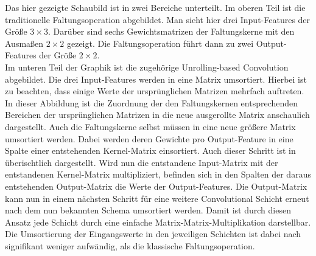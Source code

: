 \documentclass[../main.tex]{subfiles}
\begin{document}
Das hier gezeigte Schaubild ist in zwei Bereiche unterteilt. Im oberen Teil ist die traditionelle Faltungsoperation abgebildet. Man sieht hier drei Input-Features der Größe $3\times 3$. Darüber sind sechs Gewichtsmatrizen der Faltungskerne mit den Ausmaßen $2\times 2$ gezeigt. Die Faltungsoperation führt dann zu zwei Output-Features der Größe $2\times2$. \\ Im unteren Teil der Graphik ist die zugehörige Unrolling-based Convolution abgebildet. Die drei Input-Features werden in eine Matrix umsortiert. Hierbei ist zu beachten, dass einige Werte der ursprünglichen Matrizen mehrfach auftreten. In dieser Abbildung ist die Zuordnung der den Faltungskernen entsprechenden Bereichen der ursprünglichen Matrizen in die neue ausgerollte Matrix anschaulich dargestellt. Auch die Faltungskerne selbst müssen in eine neue größere Matrix umsortiert werden. Dabei werden deren Gewichte pro Output-Feature in eine Spalte einer entstehenden Kernel-Matrix einsortiert. Auch dieser Schritt ist in  überischtlich dargestellt. Wird nun die entstandene Input-Matrix mit der entstandenen Kernel-Matrix multipliziert, befinden sich in den Spalten der daraus entstehenden Output-Matrix die Werte der Output-Features. Die Output-Matrix kann nun in einem nächsten Schritt für eine weitere Convolutional Schicht erneut nach dem nun bekannten Schema umsortiert werden. Damit ist durch diesen Ansatz jede Schicht durch eine einfache Matrix-Matrix-Multiplikation darstellbar. Die Umsortierung der Eingangswerte in den jeweiligen Schichten ist dabei nach \cite{UNROLLING_CONV} signifikant weniger aufwändig, als die klassische Faltungsoperation. \par 
\end{document}
